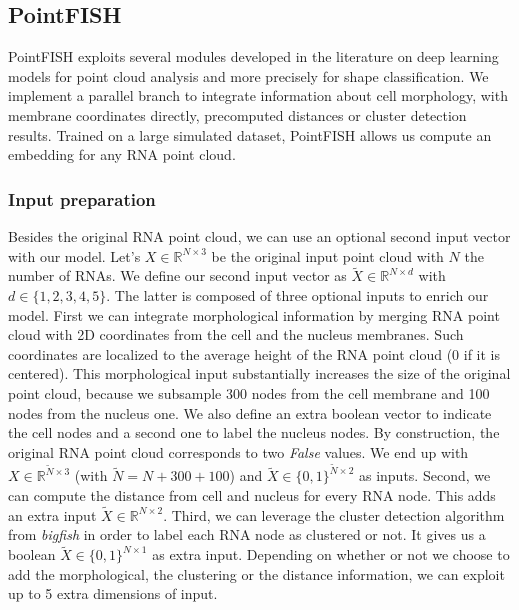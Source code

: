 
\subsection{PointFISH} \label{subsec:pointfish}

PointFISH exploits several modules developed in the literature on deep learning models for point cloud analysis and more precisely for shape classification.
We implement a parallel branch to integrate information about cell morphology, with membrane coordinates directly, precomputed distances or cluster detection results.
Trained on a large simulated dataset, PointFISH allows us compute an embedding for any \ac{RNA} point cloud.

\subsubsection{Input preparation}

Besides the original \ac{RNA} point cloud, we can use an optional second input vector with our model.
Let's $X \in \mathbb{R}^{N \times 3}$ be the original input point cloud with $N$ the number of \ac{RNA}s.
We define our second input vector as $\tilde{X} \in \mathbb{R}^{N \times d}$ with $d \in \{1, 2, 3, 4, 5\}$.
The latter is composed of three optional inputs to enrich our model.
First we can integrate morphological information by merging \ac{RNA} point cloud with 2D coordinates from the cell and the nucleus membranes.
Such coordinates are localized to the average height of the \ac{RNA} point cloud (0 if it is centered).
This morphological input substantially increases the size of the original point cloud, because we subsample 300 nodes from the cell membrane and 100 nodes from the nucleus one.
We also define an extra boolean vector to indicate the cell nodes and a second one to label the nucleus nodes.
By construction, the original \ac{RNA} point cloud corresponds to two \emph{False} values.
We end up with $X \in \mathbb{R}^{\tilde{N} \times 3}$ (with $\tilde{N} = N + 300 + 100$) and $\tilde{X} \in \{0, 1\}^{\tilde{N} \times 2}$ as inputs.
Second, we can compute the distance from cell and nucleus for every \ac{RNA} node.
This adds an extra input $\tilde{X} \in \mathbb{R}^{N \times 2}$.
Third, we can leverage the cluster detection algorithm from \emph{bigfish} in order to label each \ac{RNA} node as clustered or not.
It gives us a boolean $\tilde{X} \in \{0, 1\}^{N \times 1}$ as extra input.
Depending on whether or not we choose to add the morphological, the clustering or the distance information, we can exploit up to 5 extra dimensions of input.

